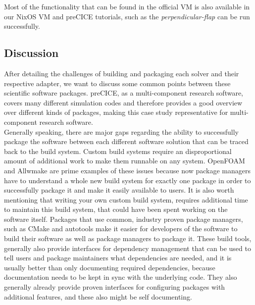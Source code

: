 \documentclass{eceasst}
\begin{document}
Most of the functionality that can be found in the official VM is also available in our NixOS VM and preCICE tutorials, such as the \textit{perpendicular-flap} can be run successfully.

\subsection{Discussion}

After detailing the challenges of building and packaging each solver and their respective adapter, we want to discuss some common points between these scientific software packages.
preCICE, as a multi-component research software, covers many different simulation codes and therefore provides a good overview over different kinds of packages, making this case study representative for multi-component research software.\\

Generally speaking, there are major gaps regarding the ability to successfully package the software between each different software solution that can be traced back to the build system.
Custom build systems require an disproportional amount of additional work to make them runnable on any system.
OpenFOAM and Allwmake are prime examples of these issues because now package managers have to understand a whole new build system for exactly one package in order to successfully package it and make it easily available to users.
It is also worth mentioning that writing your own custom build system, requires additional time to maintain this build system, that could have been spent working on the software itself.
Packages that use common, industry proven package managers, such as CMake and autotools make it easier for developers of the software to build their software as well as package managers to package it.
These build tools, generally also provide interfaces for dependency management that can be used to tell users and package maintainers what dependencies are needed, and it is usually better than only documenting required dependencies, because documentation needs to be kept in sync with the underlying code.
They also generally already provide proven interfaces for configuring packages with additional features, and these also might be self documenting.
\end{document}
